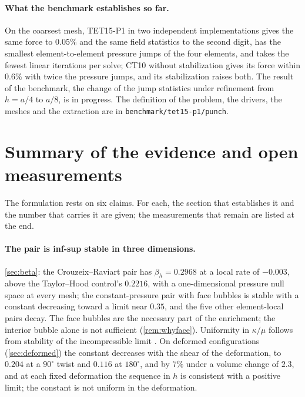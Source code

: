 \documentclass{article}
\newcommand{\code}[1]{\texttt{#1}}
\theoremstyle{definition}
\theoremstyle{plain}
\begin{document}
\paragraph{What the benchmark establishes so far.} On the coarsest mesh,
TET15-P1 in two independent implementations gives the same force to
$0.05\%$ and the same field statistics to the second digit, has the
smallest element-to-element pressure jumps of the four elements, and takes
the fewest linear iterations per solve; CT10 without
stabilization gives its force within $0.6\%$ with twice the pressure
jumps, and its stabilization raises both. The result of the benchmark, the
change of the jump statistics under refinement from $h = a/4$ to $a/8$, is
in progress. The definition of the problem, the drivers, the meshes and the
extraction are in \code{benchmark/tet15-p1/punch}.

\section{Summary of the evidence and open measurements}
\label{sec:verify}

The formulation rests on six claims. For each, the section that establishes
it and the number that carries it are given; the measurements that remain are
listed at the end.

\paragraph{The pair is inf-sup stable in three dimensions.} \cref{sec:beta}:
the Crouzeix--Raviart pair has $\beta_h = 0.2968$ at a local rate of $-0.003$,
above the Taylor--Hood control's $0.2216$, with a one-dimensional pressure
null space at every mesh; the constant-pressure pair with face bubbles is
stable with a constant decreasing toward a limit near $0.35$, and the five
other element-local pairs decay. The face bubbles are the necessary part of
the enrichment; the interior bubble alone is
not sufficient (\cref{rem:whyface}). Uniformity in $\kappa/\mu$ follows
from stability of the incompressible limit
\cite[\S5.5.2, \S8.12.1, Remark~8.12.1]{BoffiBrezziFortin:2013}. On deformed
configurations (\cref{sec:deformed}) the constant decreases with the shear
of the deformation, to $0.204$ at a $90^\circ$ twist and $0.116$ at
$180^\circ$, and by $7\%$ under a volume change of $2.3$, and at each fixed
deformation the sequence in $h$ is consistent with a positive limit; the
constant is not uniform in the deformation.
\end{document}
